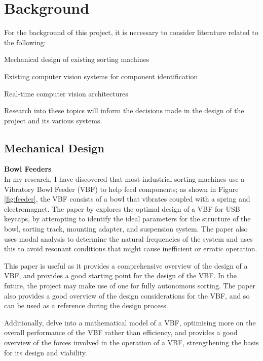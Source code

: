 \section{Background}
\label{sec:background}
For the background of this project, it is necessary to consider literature related to the following:
\begin{mylist}
  \item Mechanical design of existing sorting machines
  \item Existing computer vision systems for component identification
  \item Real-time computer vision architectures
\end{mylist}
Research into these topics will inform the decisions made in the design of the project and its various systems.

\subsection{Mechanical Design}
\noindent
\textbf{Bowl Feeders} \\
In my research, I have discovered that most industrial sorting machines use a Vibratory Bowl Feeder (VBF) to help feed components;
as shown in Figure \ref*{fig:feeder}, the VBF consists of a bowl that vibrates coupled with a spring and electromagnet.
The paper by \citet{nam2019design} explores the optimal design of a VBF for USB keycaps, by attempting to identify the ideal parameters for the structure of the bowl,
sorting track, mounting adapter, and suspension system. The paper also uses modal analysis to determine the natural frequencies of the system and uses this to
avoid resonant conditions that might cause inefficient or erratic operation.

This paper is useful as it provides a comprehensive overview of the design of a VBF, and provides a good starting point for the design of the VBF. In the future,
the project may make use of one for fully autonomous sorting. The paper also provides a good overview of the design considerations for the VBF, and so can be used as a reference
during the design process.

Additionally, \citet{REINHART2010191} delve into a mathematical model of a VBF, optimising more on the overall performance of the VBF rather than efficiency, and \citet{ForceAnalysisofVibratoryBowlFeeder}
provides a good overview of the forces involved in the operation of a VBF, strengthening the basis for its design and viability.

